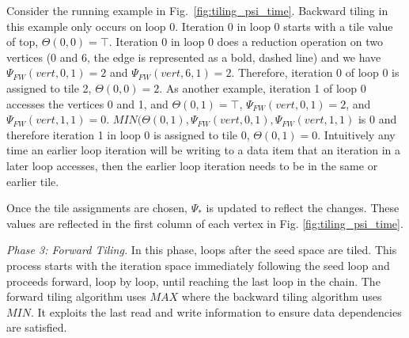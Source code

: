 Consider the running example in Fig.~\ref{fig:tiling_psi_time}. 
Backward tiling in this example only occurs on loop 0.
Iteration 0 in loop 0 starts with a tile value of top, $\Theta(0,0) = \top$.
Iteration 0 in loop 0 does a reduction operation on two vertices 
(0 and 6, the edge is represented as a bold, dashed line)
and we have 
$\Psi_{FW}(vert,0,1) = 2$ and $\Psi_{FW}(vert,6,1) = 2$.
Therefore, iteration 0 of loop 0 is assigned to tile 2, $\Theta(0,0) = 2$.
As another example, iteration 1 of loop 0 accesses the vertices 0 and 1, and
$\Theta(0,1) = \top$, 
$\Psi_{FW}(vert,0,1) =  2$, and $\Psi_{FW}(vert,1,1) = 0$.
$MIN(\Theta(0,1),\Psi_{FW}(vert,0,1),\Psi_{FW}(vert,1,1)$  is 0 and therefore iteration 1 
in loop 0 is assigned to tile 0, $\Theta(0,1)=0$.
Intuitively any time an earlier loop iteration will be writing to a data item that an iteration in
a later loop accesses, then the earlier loop iteration needs to be in the same or
earlier tile.

Once the tile assignments are chosen, $\Psi_*$ is updated to reflect the changes.
These values are reflected in the first column of each vertex in Fig. \ref{fig:tiling_psi_time}.


\emph{Phase 3: Forward Tiling.}
In this phase, loops after the 
seed space are tiled. This process starts with the iteration space immediately 
following the seed loop and proceeds forward, loop by loop, until 
reaching the last loop in the chain. The forward tiling algorithm uses $MAX$ where
the backward tiling algorithm uses $MIN$. It exploits the last read and write information
to ensure data dependencies are satisfied.


